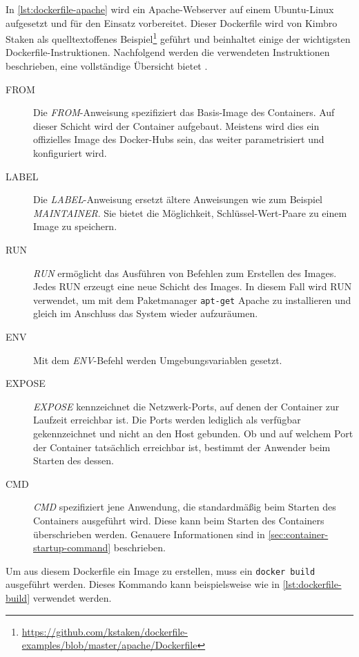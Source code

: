 In \cref{lst:dockerfile-apache} wird ein Apache-Webserver auf einem Ubuntu-Linux aufgesetzt und für den Einsatz vorbereitet.
Dieser Dockerfile wird von Kimbro Staken als quelltextoffenes Beispiel\footnote{\url{https://github.com/kstaken/dockerfile-examples/blob/master/apache/Dockerfile}} geführt und beinhaltet einige der wichtigsten Dockerfile-Instruktionen.
Nachfolgend werden die verwendeten Instruktionen beschrieben, eine vollständige Übersicht bietet \autocite{docker-dockerfile:online}.
\begin{description}
    \item[FROM] Die \emph{FROM}-Anweisung spezifiziert das Basis-Image des Containers. Auf dieser Schicht wird der Container aufgebaut. Meistens wird dies ein offizielles Image des Docker-Hubs sein, das weiter parametrisiert und konfiguriert wird.
    \item[LABEL] Die \emph{LABEL}-Anweisung ersetzt ältere Anweisungen wie zum Beispiel \emph{MAINTAINER}. Sie bietet die Möglichkeit, Schlüssel-Wert-Paare zu einem Image zu speichern.
    \item[RUN] \emph{RUN} ermöglicht das Ausführen von Befehlen zum Erstellen des Images. Jedes RUN erzeugt eine neue Schicht des Images. In diesem Fall wird RUN verwendet, um mit dem Paketmanager \texttt{apt-get} Apache zu installieren und gleich im Anschluss das System wieder aufzuräumen.
    \item[ENV] Mit dem \emph{ENV}-Befehl werden Umgebungsvariablen gesetzt.
    \item[EXPOSE] \emph{EXPOSE} kennzeichnet die Netzwerk-Ports, auf denen der Container zur Laufzeit erreichbar ist. Die Ports werden lediglich als verfügbar gekennzeichnet und nicht an den Host gebunden. Ob und auf welchem Port der Container tatsächlich erreichbar ist, bestimmt der Anwender beim Starten des dessen.
    \item[CMD] \emph{CMD} spezifiziert jene Anwendung, die standardmäßig beim Starten des Containers ausgeführt wird. Diese kann beim Starten des Containers überschrieben werden. Genauere Informationen sind in \cref{sec:container-startup-command} beschrieben.
\end{description}


Um aus diesem Dockerfile ein Image zu erstellen, muss ein \texttt{docker build} ausgeführt werden.
Dieses Kommando kann beispielsweise wie in \cref{lst:dockerfile-build} verwendet werden.


